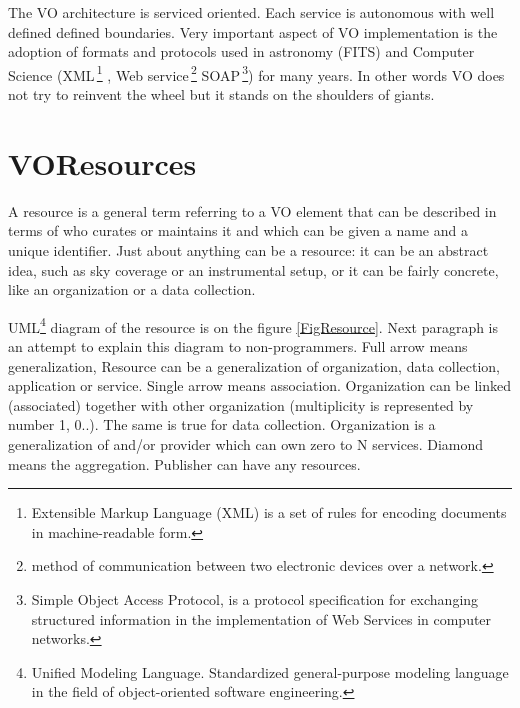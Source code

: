 \clearpage

The VO architecture is serviced oriented. Each service is autonomous
with well defined defined boundaries. Very important aspect of VO
implementation is the adoption of formats and protocols used in
astronomy (FITS) and Computer Science (XML\,\footnote{Extensible
  Markup Language (XML) is a set of rules for encoding documents in
  machine-readable form.} , Web service\,\footnote{method of
  communication between two electronic devices over a network.} SOAP\,\footnote{Simple Object Access Protocol, is a protocol specification
  for exchanging structured information in the implementation of Web
  Services in computer networks.}) for many years. In other words VO
does not try to reinvent the wheel but it stands on the shoulders of
giants.


\section{VOResources}

A resource is a general term referring to a VO element that can be
described in terms of who curates or maintains it and which can be
given a name and a unique identifier. Just about anything can be a
resource: it can be an abstract idea, such as sky coverage or an
instrumental setup, or it can be fairly concrete, like an organization
or a data collection. \citep{bensonivoa}

UML\footnote{Unified Modeling Language. Standardized general-purpose
  modeling language in the field of object-oriented software
  engineering.}  diagram of the resource is on the figure
\ref{FigResource}. Next paragraph is an attempt to explain this
diagram to non-programmers. Full arrow means generalization, Resource
can be a generalization of organization, data collection, application
or service. Single arrow means association. Organization can be linked
(associated) together with other organization (multiplicity is
represented by number 1, 0..). The same is true for data
collection. Organization is a generalization of and/or provider which
can own zero to N services. Diamond means the aggregation. Publisher
can have any resources.
  
